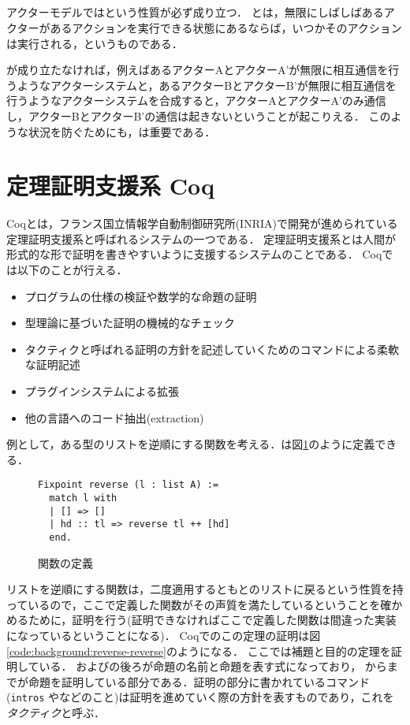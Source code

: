 \subsection{\fairness}

アクターモデルでは\fairness という性質が必ず成り立つ．
\fairness とは，無限にしばしばあるアクターがあるアクションを実行できる状態にあるならば，いつかそのアクションは実行される，というものである．

\fairness が成り立たなければ，例えばあるアクターAとアクターA'が無限に相互通信を行うようなアクターシステムと，あるアクターBとアクターB'が無限に相互通信を行うようなアクターシステムを合成すると，アクターAとアクターA'のみ通信し，アクターBとアクターB'の通信は起きないということが起こりえる．
このような状況を防ぐためにも，\fairness は重要である．


\section{定理証明支援系 Coq}

Coq\cite{Coq}とは，フランス国立情報学自動制御研究所(INRIA)で開発が進められている定理証明支援系と呼ばれるシステムの一つである．
定理証明支援系とは人間が形式的な形で証明を書きやすいように支援するシステムのことである．
Coqでは以下のことが行える．

\begin{itemize}
\item プログラムの仕様の検証や数学的な命題の証明
\item 型理論に基づいた証明の機械的なチェック
\item タクティクと呼ばれる証明の方針を記述していくためのコマンドによる柔軟な証明記述
\item プラグインシステムによる拡張
\item 他の言語へのコード抽出(extraction)
\end{itemize}

例として，ある型のリストを逆順にする関数を考える．は図\ref{code:background:reverse}のように定義できる．

\begin{figure}
\begin{lstlisting}
Fixpoint reverse (l : list A) :=
  match l with
  | [] => []
  | hd :: tl => reverse tl ++ [hd]
  end.
\end{lstlisting}
\label{code:background:reverse}
\caption{関数の定義}
\end{figure}

リストを逆順にする関数は，二度適用するともとのリストに戻るという性質を持っているので，ここで定義した関数がその声質を満たしているということを確かめるために，証明を行う(証明できなければここで定義した関数は間違った実装になっているということになる)．
Coqでのこの定理の証明は図\ref{code:background:reverse-reverse}のようになる．
ここでは補題と目的の定理を証明している．
およびの後ろが命題の名前と命題を表す式になっており，
からまでが命題を証明している部分である．証明の部分に書かれているコマンド(\lstinline{intros} やなどのこと)は証明を進めていく際の方針を表すものであり，これを\emph{タクティク}と呼ぶ．

